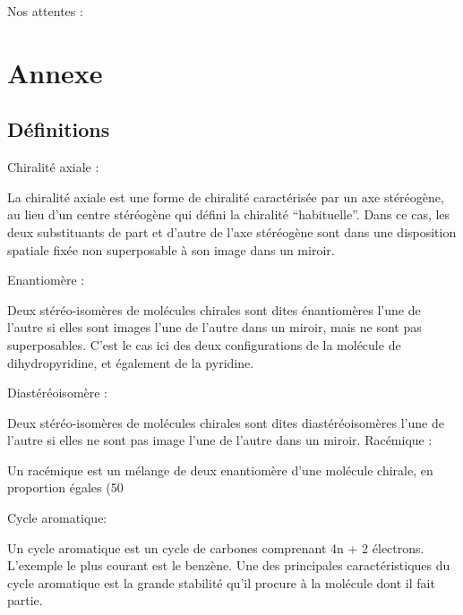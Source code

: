 \documentclass{article}
\begin{document}
Nos attentes :

























\newpage



\section{Annexe}

\subsection{Définitions}
\medbreak
Chiralité axiale :  

La chiralité axiale est une forme de chiralité caractérisée par un axe stéréogène, au lieu d’un centre stéréogène qui défini la chiralité “habituelle”. Dans ce cas, les deux substituants de part et d’autre de l’axe stéréogène sont dans une disposition spatiale fixée non superposable à son image dans un miroir.    
\medbreak

Enantiomère : 

Deux stéréo-isomères de molécules chirales sont dites énantiomères l’une de l’autre si elles sont images l’une de l’autre dans un miroir, mais ne sont pas superposables. C’est le cas ici des deux configurations de la molécule de dihydropyridine, et également de la pyridine.

\medbreak
Diastéréoisomère : 

Deux stéréo-isomères de molécules chirales sont dites diastéréoisomères l’une de l’autre si elles ne sont pas image l’une de l’autre dans un miroir. 
\medbreak
Racémique :

Un racémique est un mélange de deux enantiomère d’une molécule chirale, en proportion égales (50%

\medbreak
Cycle aromatique: 

Un cycle aromatique est un cycle de carbones comprenant 4n + 2 électrons. L’exemple le plus courant est le benzène. Une des principales caractéristiques du cycle aromatique est la grande stabilité qu’il procure à la molécule dont il fait partie. 
\end{document}

